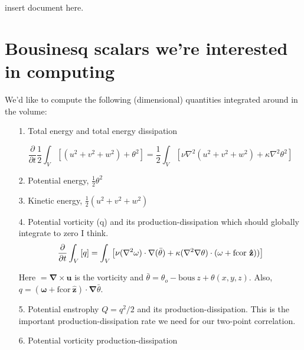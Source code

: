 \documentclass[12pt]{article}
\begin{document}
insert document here.

\section{Bousinesq scalars we're interested in computing}

We'd like to compute the following (dimensional) quantities integrated
around in the volume:

\begin{itemize}
\item[1.] Total energy and total energy dissipation

\begin{equation}
\frac{\partial}{\partial t} \frac{1}{2} \int_V  
         \left[  (u^2 + v^2 + w^2) +   \theta^2\right]  
= \frac{1}{2}\int_V \left[  \nu \nabla^2 (u^2 + v^2 + w^2)  
                     + \kappa \nabla^2 \theta^2
                         \right] 
\end{equation}

\item[2.] Potential energy, $\frac{1}{2} \theta^2$ 

\item[3.] Kinetic energy, $\frac{1}{2} ( u^2 + v^2 + w^2 )$ 
  
\item[4.] Potential vorticity (q) and its production-dissipation which
  should globally integrate to zero I think.
  \begin{equation}
  \frac{\partial}{\partial t} \int_V   
           \left[ q \right]  
  = \int_V \left[ \nu (\nabla^2 \mathbf\omega) \cdot \mathbf{\nabla}
    (\bar{\theta})
                       + \kappa (\nabla^2 \mathbf{\nabla} \theta) \cdot  
                       (\mathbf\omega  
                       + \text{fcor} ~{\bf{\hat{z}}} ))  
                           \right]  
  \end{equation}
  
  Here $\mathbf = \mathbf\nabla \times \mathbf u$ is the vorticity and
  $\bar\theta = \theta_o -\text{bous}~ z + \theta(x,y,z)$. Also, $q =
  (\mathbf\omega + \text{fcor}~\mathbf{\hat{z}}) \cdot \mathbf\nabla
  \bar\theta.$

\item[5.] Potential enstrophy $Q = q^2/2$ and its
  production-dissipation. This is the important production-dissipation
  rate we need for our two-point correlation.

\item[6.] Potential vorticity production-dissipation


\end{itemize}
\end{document}
